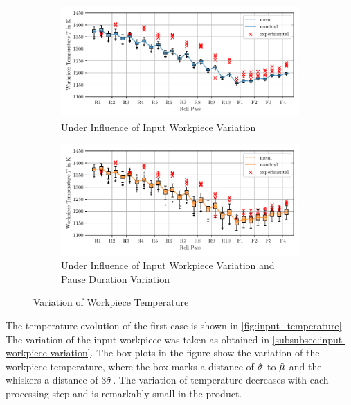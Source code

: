 \begin{figure}
    \begin{subfigure}{\linewidth}
        \centering
        \includegraphics{img/input_temperature}
        \caption{Under Influence of Input Workpiece Variation}
        \label{fig:input_temperature}
    \end{subfigure}
    \begin{subfigure}{\linewidth}
        \centering
        \includegraphics{img/durations_temperature}
        \caption{Under Influence of Input Workpiece Variation and Pause Duration Variation}
        \label{fig:durations_temperature}
    \end{subfigure}
    \caption{Variation of Workpiece Temperature}
\end{figure}


The temperature evolution of the first case is shown in \autoref{fig:input_temperature}.
The variation of the input workpiece was taken as obtained in \autoref{subsubsec:input-workpiece-variation}.
The box plots in the figure show the variation of the workpiece temperature, where the box marks a distance of ${\hat{{\sigma}}}$ to ${\hat{{\mu}}}$ and the whiskers a distance of $3{\hat{{\sigma}}}$.
The variation of temperature decreases with each processing step and is remarkably small in the product.

